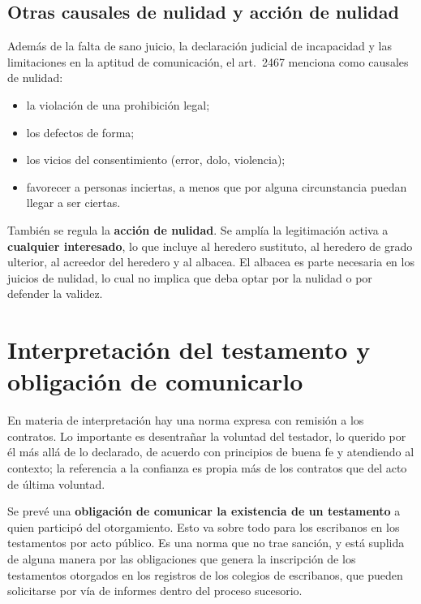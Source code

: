 \documentclass[12pt,oneside]{book}
\begin{document}
\subsection{Otras causales de nulidad y acción de nulidad}

Además de la falta de sano juicio, la declaración judicial de incapacidad y las limitaciones en la aptitud de comunicación, el art.~2467 menciona como causales de nulidad:

\begin{itemize}
    \item la violación de una prohibición legal;
    \item los defectos de forma;
    \item los vicios del consentimiento (error, dolo, violencia);
    \item favorecer a personas inciertas, a menos que por alguna circunstancia puedan llegar a ser ciertas.
\end{itemize}

También se regula la \textbf{acción de nulidad}. Se amplía la legitimación activa a \textbf{cualquier interesado}, lo que incluye al heredero sustituto, al heredero de grado ulterior, al acreedor del heredero y al albacea. El albacea es parte necesaria en los juicios de nulidad, lo cual no implica que deba optar por la nulidad o por defender la validez.

\section{Interpretación del testamento y obligación de comunicarlo}

En materia de interpretación hay una norma expresa con remisión a los contratos. Lo importante es desentrañar la voluntad del testador, lo querido por él más allá de lo declarado, de acuerdo con principios de buena fe y atendiendo al contexto; la referencia a la confianza es propia más de los contratos que del acto de última voluntad.

Se prevé una \textbf{obligación de comunicar la existencia de un testamento} a quien participó del otorgamiento. Esto va sobre todo para los escribanos en los testamentos por acto público. Es una norma que no trae sanción, y está suplida de alguna manera por las obligaciones que genera la inscripción de los testamentos otorgados en los registros de los colegios de escribanos, que pueden solicitarse por vía de informes dentro del proceso sucesorio.
\end{document}

